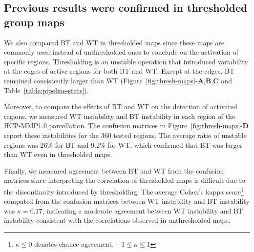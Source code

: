 \documentclass[11pt,onecolumn]{article}
\begin{document}


\subsection{Previous results were confirmed in thresholded group maps}

We also compared BT and WT in thresholded maps since these maps are commonly used instead of unthresholded ones 
to conclude on the activation of specific regions. Thresholding is an unstable operation
that introduced variability at the edges of
active regions for both BT and WT. Except at the edges, BT remained consistently larger
than WT (Figure~\ref{fig:thresh-maps}-\textbf{A},\textbf{B},\textbf{C} and Table~\ref{table:pipeline-stats}). 

Moreover, to compare the effects of BT and WT on the detection of activated
regions, we measured WT instability and BT instability in each region of
the HCP-MMP1.0 parcellation. The confusion matrices in
Figure~\ref{fig:thresh-maps}-\textbf{D} report these instabilities for the
360 tested regions. The average ratio of unstable regions was 26\% for BT
and 9.2\% for WT, which confirmed that BT was larger than
WT even in thresholded maps.

Finally, we measured agreement between BT and WT from the confusion
matrices since interpreting the correlation of thresholded maps is
difficult due to the discontinuity introduced by thresholding. 
The average Cohen's kappa score\footnote{$\kappa \leq 0$ denotes chance agreement, $-1 \leq \kappa \leq 1$}
computed from the confusion matrices between WT instability and BT instability was $\kappa=0.17$, indicating
a moderate agreement between WT instability and BT instability consistent with the correlations observed in 
unthresholded maps.
\end{document}
